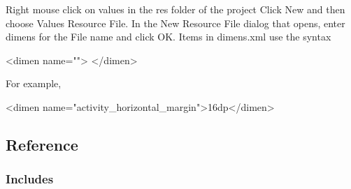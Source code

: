 \documentclass{report}
\begin{document}
\begin{itemize}
            \bigbreak \noindent 
            Right mouse click on values in the res folder of the project
            \bigbreak \noindent 
            Click New and then choose Values Resource File.
            \bigbreak \noindent 
            In the New Resource File dialog that opens, enter dimens for the File name and click OK.
            \bigbreak \noindent 
            Items in dimens.xml use the syntax
            \bigbreak \noindent 
            \begin{xmlcode}
            <dimen name=""> </dimen>
            \end{xmlcode}
            \bigbreak \noindent 
            For example,
            \bigbreak \noindent 
            \begin{xmlcode}
                <dimen name="activity_horizontal_margin">16dp</dimen>
            \end{xmlcode}
    \end{itemize}

    \pagebreak 
    \subsection{Reference}
    \bigbreak \noindent 
    \subsubsection{Includes}
    \begin{itemize}
        
    \end{itemize}

    \pagebreak 
\end{document}
